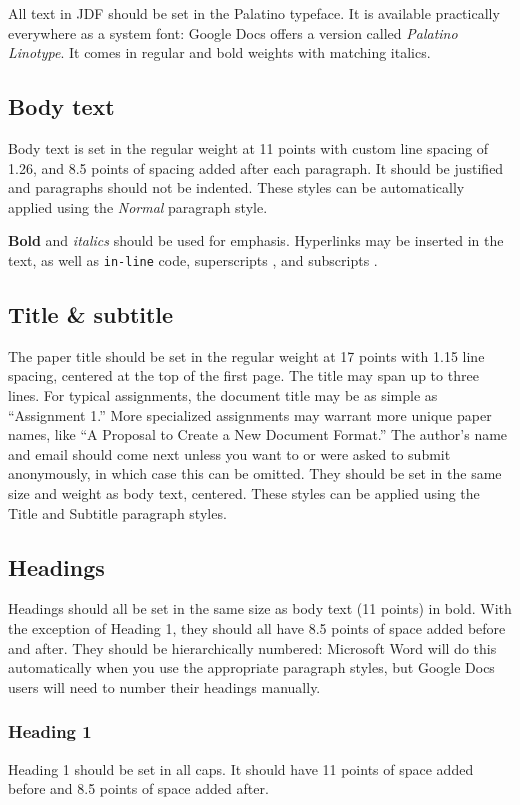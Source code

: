 {{{{All text in JDF should be set in the Palatino typeface. It is available practically everywhere as a system font: Google Docs offers a version called \emph{Palatino Linotype}. It comes in regular and bold weights with matching italics.

\subsection{Body text}
Body text is set in the regular weight at 11 points with custom line spacing of 1.26, and 8.5 points of spacing added after each paragraph. It should be justified and paragraphs should not be indented. These styles can be automatically applied using the \emph{Normal} paragraph style.

\textbf{Bold} and \emph{italics} should be used for emphasis. Hyperlinks may be inserted in the text, as well as \texttt{in-line} code, superscripts , and subscripts .

\subsection{Title \& subtitle}
The paper title should be set in the regular weight at 17 points with 1.15 line spacing, centered at the top of the first page. The title may span up to three lines. For typical assignments, the document title may be as simple as “Assignment 1.” More specialized assignments may warrant more unique paper names, like “A Proposal to Create a New Document Format.”
The author’s name and email should come next unless you want to or were asked to submit anonymously, in which case this can be omitted. They should be set in the same size and weight as body text, centered. These styles can be applied using the Title and Subtitle paragraph styles.

\subsection{Headings}
Headings should all be set in the same size as body text (11 points) in bold. With the exception of Heading 1, they should all have 8.5 points of space added before and after. They should be hierarchically numbered: Microsoft Word will do this automatically when you use the appropriate paragraph styles, but Google Docs users will need to number their headings manually.

\subsubsection{Heading 1}
Heading 1 should be set in all caps. It should have 11 points of space added before and 8.5 points of space added after.

}}}}
